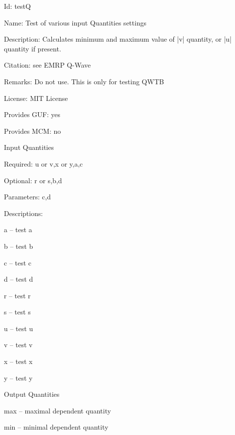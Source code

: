 \begin{tightdesc}
\item [Id:] testQ
\item [Name:] Test of various input Quantities settings
\item [Description:] Calculates minimum and maximum value of |v| quantity, or |u| quantity if present.
\item [Citation:] see EMRP Q-Wave
\item [Remarks:] Do not use. This is only for testing QWTB
\item [License:] MIT License
\item [Provides GUF:] yes
\item [Provides MCM:] no
\item [Input Quantities] \rule{0em}{0em}
    \begin{tightdesc}
    \item [Required:] 
        \textsf{u} or \textsf{v},\enspace \textsf{x} or \textsf{y},\enspace \textsf{a},\enspace \textsf{c}
    \item [Optional:] 
        \textsf{r} or \textsf{s},\enspace \textsf{b},\enspace \textsf{d}
    \item [Parameters:] 
        \textsf{c},\enspace \textsf{d}
    \end{tightdesc}
\item [Descriptions:] \rule{0em}{0em}
    \begin{tightdesc}
        \item[\textsf{a}] -- test a
        \item[\textsf{b}] -- test b
        \item[\textsf{c}] -- test c
        \item[\textsf{d}] -- test d
        \item[\textsf{r}] -- test r
        \item[\textsf{s}] -- test s
        \item[\textsf{u}] -- test u
        \item[\textsf{v}] -- test v
        \item[\textsf{x}] -- test x
        \item[\textsf{y}] -- test y
    \end{tightdesc}
\item [Output Quantities] \rule{0em}{0em}
    \begin{tightdesc}
        \item[\textsf{max}] -- maximal dependent quantity
        \item[\textsf{min}] -- minimal dependent quantity
    \end{tightdesc}
\end{tightdesc}

